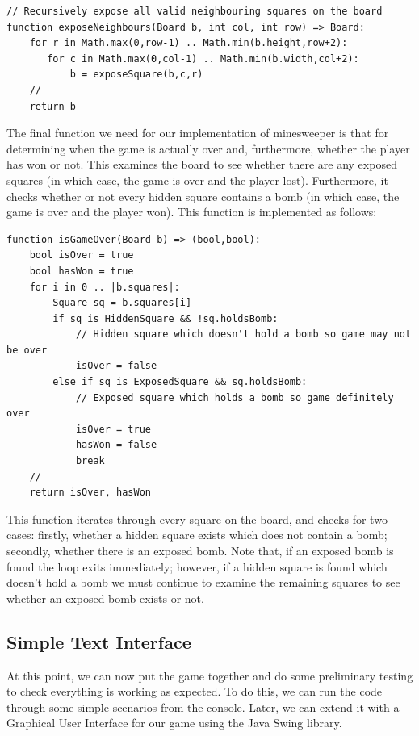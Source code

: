 \begin{lstlisting}
// Recursively expose all valid neighbouring squares on the board
function exposeNeighbours(Board b, int col, int row) => Board:
    for r in Math.max(0,row-1) .. Math.min(b.height,row+2):
       for c in Math.max(0,col-1) .. Math.min(b.width,col+2):
           b = exposeSquare(b,c,r)
    //
    return b
\end{lstlisting}

The final function we need for our implementation of minesweeper is that for determining when the game is actually over and, furthermore, whether the player has won or not.  This examines the board to see whether there are any exposed squares (in which case, the game is over and the player lost).  Furthermore, it checks whether or not every hidden square contains a bomb (in which case, the game is over and the player won).  This function is implemented as follows:

\begin{lstlisting}
function isGameOver(Board b) => (bool,bool):
    bool isOver = true
    bool hasWon = true
    for i in 0 .. |b.squares|:
        Square sq = b.squares[i]
        if sq is HiddenSquare && !sq.holdsBomb:
            // Hidden square which doesn't hold a bomb so game may not be over
            isOver = false
        else if sq is ExposedSquare && sq.holdsBomb:
            // Exposed square which holds a bomb so game definitely over
            isOver = true
            hasWon = false
            break
    //
    return isOver, hasWon
\end{lstlisting}
This function iterates through every square on the board, and checks for two cases: firstly, whether a hidden square exists which does not contain a bomb; secondly, whether there is an exposed bomb.  Note that, if an exposed bomb is found the loop exits immediately; however, if a hidden square is found which doesn't hold a bomb we must continue to examine the remaining squares to see whether an exposed bomb exists or not.

\subsection{Simple Text Interface}
At this point, we can now put the game together and do some preliminary testing to check everything is working as expected.  To do this, we can run the code through some simple scenarios from the console.  Later, we can extend it with a Graphical User Interface for our game using the Java Swing library. 

